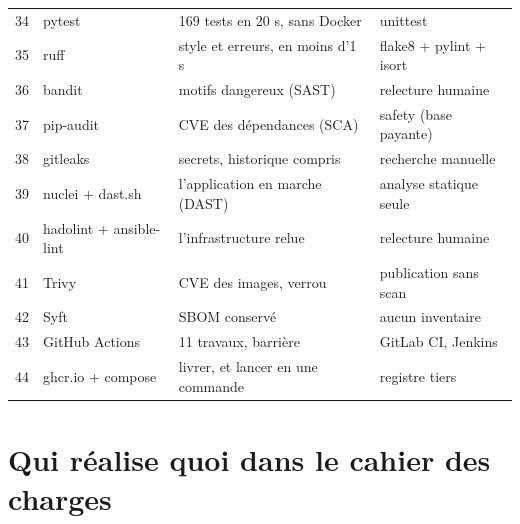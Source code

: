 \begin{center}
\begin{tabularx}{\textwidth}{@{}clXX@{}}
34 & pytest & 169 tests en 20 s, sans Docker & unittest \\
35 & ruff & style et erreurs, en moins d'1 s & flake8 + pylint + isort \\
36 & bandit & motifs dangereux (SAST) & relecture humaine \\
37 & pip-audit & CVE des dépendances (SCA) & safety (base payante) \\
38 & gitleaks & secrets, historique compris & recherche manuelle \\
39 & nuclei + dast.sh & l'application en marche (DAST) & analyse statique seule \\
40 & hadolint + ansible-lint & l'infrastructure relue & relecture humaine \\
41 & Trivy & CVE des images, verrou & publication sans scan \\
42 & Syft & SBOM conservé & aucun inventaire \\
43 & GitHub Actions & 11 travaux, barrière & GitLab CI, Jenkins \\
44 & ghcr.io + compose & livrer, et lancer en une commande & registre tiers \\
\bottomrule
\end{tabularx}
\end{center}

\section{Qui réalise quoi dans le cahier des charges}

